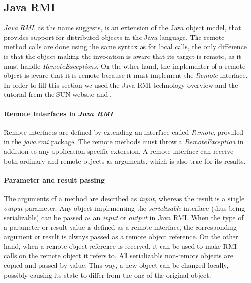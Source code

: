 
\subsection{Java RMI} \label{JavaRMI}   

\textit{Java RMI}, as the name suggests, is an extension of the Java object model, that provides support for distributed objects in the Java language. The remote method calls are done using the same syntax as for local calls, the only difference is that the object making the invocation is aware that its target is remote, as it must handle \textit{RemoteExceptions}. On the other hand, the implementer of a remote object is aware that it is remote because it must implement the \textit{Remote} interface. In order to fill this section we used the Java RMI technology overview \cite{RMI-sun} and the tutorial from the SUN website \cite{RMI-client-sun} and \cite{RMI-overview-sun}.

\paragraph{Remote Interfaces in \textit{Java RMI}}

Remote interfaces are defined by extending an interface called \textit{Remote}, provided in the \textit{java.rmi} package. The remote methods must throw a \textit{RemoteException} in addition to any application specific extension. A remote interface can receive both ordinary and remote objects as arguments, which is also true for its results.

\paragraph{Parameter and result passing}

The arguments of a method are described as \textit{input}, whereas the result is a single \textit{output} parameter. Any object implementing the \textit{serializable} interface (thus being serializable) can be passed as an \textit{input} or \textit{output} in Java RMI.
When the type of a parameter or result value is defined as a remote interface, the corresponding argument or result is always passed as a remote object reference. On the other hand, when a remote object reference is received, it can be used to make RMI calls on the remote object it refers to.
All serializable non-remote objects are copied and passed by value. This way, a new object can be changed locally, possibly causing its state to differ from the one of the original object.

